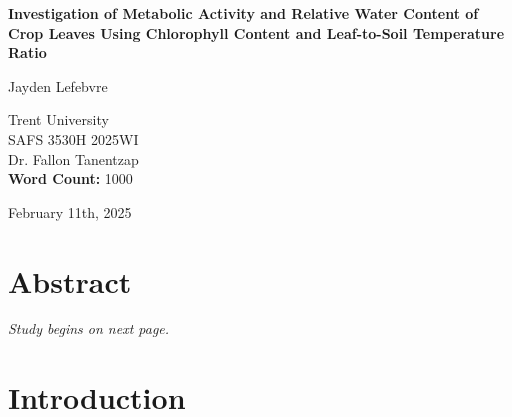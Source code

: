 \documentclass{report}
\begin{document}
\begin{titlepage}
    \begin{center}
        \vspace*{1.2cm}

        \textbf{Investigation of Metabolic Activity and Relative Water Content of Crop Leaves Using Chlorophyll Content and Leaf-to-Soil Temperature Ratio}

        \vspace{2cm}

        Jayden Lefebvre\\

        \vspace{5cm}
        
        Trent University\\
        SAFS 3530H 2025WI\\
        Dr. Fallon Tanentzap\\
        \textbf{Word Count:} 1000

        \vfill

        February 11th, 2025
        
    \end{center}
\end{titlepage}

\clearpage

\thispagestyle{plain}
\tableofcontents

\vfill

\clearpage

\section*{Abstract}

\vfill

\textit{Study begins on next page.}

\vspace{1cm}

\clearpage


\section{Introduction}

\end{document}
